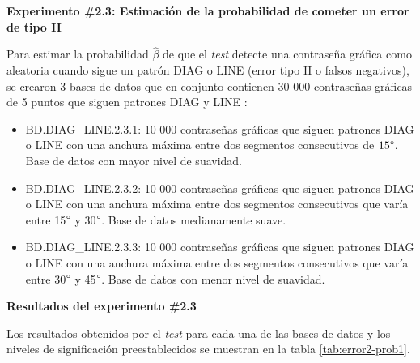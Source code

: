 \documentclass[12pt]{report}
\begin{document}
\textbf{Experimento \#2.3: Estimación de la probabilidad de cometer un error de tipo II}

Para estimar la probabilidad $\hat{\beta}$ de que el \textit{test} detecte una contraseña gráfica como aleatoria cuando sigue un patrón DIAG o LINE (error tipo II o falsos negativos), se crearon 3 bases de datos que en conjunto contienen 30 000 contraseñas gráficas de 5 puntos que siguen patrones DIAG y LINE :
\begin{itemize}
	\item BD.DIAG\_LINE.2.3.1: 10 000 contraseñas gráficas que siguen patrones DIAG o LINE con una anchura máxima entre dos segmentos consecutivos de $15\degree$. Base de datos con mayor nivel de suavidad. 
	\item BD.DIAG\_LINE.2.3.2: 10 000 contraseñas gráficas que siguen patrones DIAG o LINE con una anchura máxima entre dos segmentos consecutivos que varía entre 15$\degree$ y 30$\degree$. Base de datos medianamente suave. 
	\item BD.DIAG\_LINE.2.3.3: 10 000 contraseñas gráficas que siguen patrones DIAG o LINE con una anchura máxima entre dos segmentos consecutivos que varía entre 30$\degree$ y 45$\degree$. Base de datos con menor nivel de suavidad.
\end{itemize}
\textbf{Resultados del experimento \#2.3}

Los resultados obtenidos por el \textit{test}  para cada una de las bases de datos y los  niveles de significación preestablecidos se muestran en la tabla \ref{tab:error2-prob1}.
\end{document}
